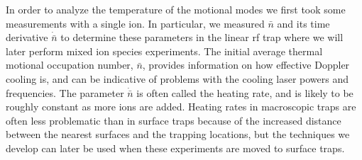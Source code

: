 In order to analyze the temperature of the motional modes we first took some measurements with a single ion.  In particular, we measured $\bar{n}$ and its time derivative $\dot{\bar{n}}$ to determine these parameters in the linear rf trap where we will later perform mixed ion species experiments.  The initial average thermal motional occupation number, $\bar{n}$, provides information on how effective Doppler cooling is, and can be indicative of problems with the cooling laser powers and frequencies.  The parameter $\dot{\bar{n}}$ is often called the heating rate, and is likely to be roughly constant as more ions are added.  Heating rates in macroscopic traps are often less problematic than in surface traps because of the increased distance between the nearest surfaces and the trapping locations, but the techniques we develop can later be used when these experiments are moved to surface traps.  

